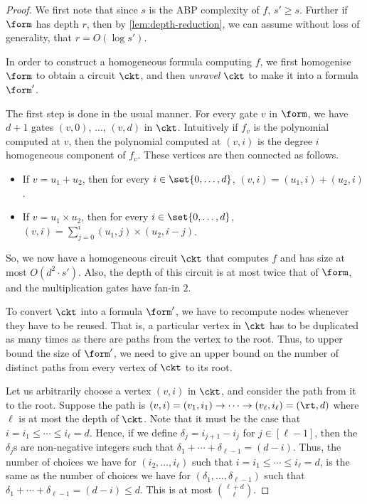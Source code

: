 \homogenisation*

\begin{proof}
	We first note that since $s$ is the ABP complexity of $f$, $s' \geq s$.
	Further if $\form$ has depth $r$, then by \autoref{lem:depth-reduction}, we can assume without loss of generality, that $r = O(\log s')$.
	
	In order to construct a homogeneous formula computing $f$, we first homogenise $\form$ to obtain a circuit $\ckt$, and then \emph{unravel} $\ckt$ to make it into a formula $\form'$.	
	
	The first step is done in the usual manner.
	For every gate $v$ in $\form$, we have $d+1$ gates $(v,0)$, $\ldots$, $(v,d)$ in $\ckt$.
	Intuitively if $f_v$ is the polynomial computed at $v$, then the polynomial computed at $(v,i)$ is the degree $i$ homogeneous component of $f_v$. 
	These vertices are then connected as follows.
	
	\begin{itemize}
		\item If $v = u_1 + u_2$, then for every $i \in \set{0, \ldots, d}$, \qquad $(v, i) = (u_1, i) + (u_2, i)$.
		\item If $v = u_1 \times u_2$, then for every $i \in \set{0, \ldots, d}$, \qquad $(v, i) = \sum_{j=0}^{i} (u_1, j) \times (u_2, i-j)$.
	\end{itemize}

	So, we now have a homogeneous circuit $\ckt$ that computes $f$ and has size at most $O(d^2 \cdot s')$.
	Also, the depth of this circuit is at most twice that of $\form$, and the multiplication gates have fan-in $2$.
%
	
	To convert $\ckt$ into a formula $\form'$, we have to recompute nodes whenever they have to be reused. 
	That is, a particular vertex in $\ckt$ has to be duplicated as many times as there are paths from the vertex to the root. 
	Thus, to upper bound the size of $\form'$, we need to give an upper bound on the number of distinct paths from every vertex of $\ckt$ to its root.
	
	Let us arbitrarily choose a vertex $(v,i)$ in $\ckt$, and consider the path from it to the root. 
	Suppose the path is $(v,i) = (v_1, i_1) \rightarrow \cdots \rightarrow (v_\ell, i_\ell) = (\rt, d)$ where $\ell$ is at most the depth of $\ckt$. 
	Note that it must be the case that $i = i_1 \leq \cdots \leq i_\ell = d$. 
	Hence, if we define $\delta_j = i_{j+1} - i_j$ for $j \in [\ell-1]$, then the $\delta_j$s are non-negative integers such that $\delta_1 + \cdots + \delta_{\ell-1} = (d - i)$. 
	Thus, the number of  choices we have for $(i_2, \ldots, i_\ell)$ such that $i = i_1 \leq \cdots \leq i_\ell = d$, is the same as the number of choices we have for $(\delta_1, \ldots, \delta_{\ell-1})$ such that $\delta_1 + \cdots + \delta_{\ell -  1} = (d - i) \leq d$. 
	This is at most ${\ell + d}\choose{\ell}$.
	

\end{proof}

